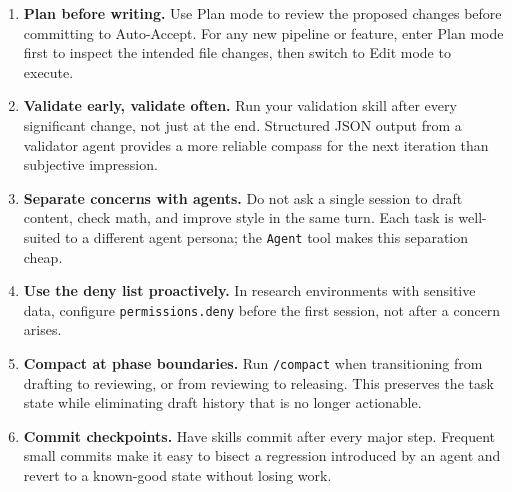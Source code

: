 \begin{enumerate}
  \item \textbf{Plan before writing.}  Use Plan mode to review the proposed
        changes before committing to Auto-Accept.  For any new pipeline or
        feature, enter Plan mode first to inspect the intended file changes,
        then switch to Edit mode to execute.

  \item \textbf{Validate early, validate often.}  Run your validation skill
        after every significant change, not just at the end.  Structured JSON
        output from a validator agent provides a more reliable compass for the
        next iteration than subjective impression.

  \item \textbf{Separate concerns with agents.}  Do not ask a single session to
        draft content, check math, and improve style in the same turn.  Each
        task is well-suited to a different agent persona; the \texttt{Agent}
        tool makes this separation cheap.

  \item \textbf{Use the deny list proactively.}  In research environments with
        sensitive data, configure \texttt{permissions.deny} before the first
        session, not after a concern arises.

  \item \textbf{Compact at phase boundaries.}  Run \texttt{/compact} when
        transitioning from drafting to reviewing, or from reviewing to
        releasing.  This preserves the task state while eliminating draft
        history that is no longer actionable.

  \item \textbf{Commit checkpoints.}  Have skills commit after every major step.
        Frequent small commits make it easy to bisect a regression introduced
        by an agent and revert to a known-good state without losing work.
\end{enumerate}
